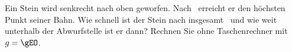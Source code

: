 Ein Stein wird senkrecht nach oben geworfen. Nach \tobO\ erreicht er den höchsten Punkt seiner Bahn. Wie schnell ist der Stein nach insgesamt \tgsO\ und wie weit unterhalb der Abwurfstelle ist er dann? Rechnen Sie ohne Taschenrechner mit $g = \gEO$.
